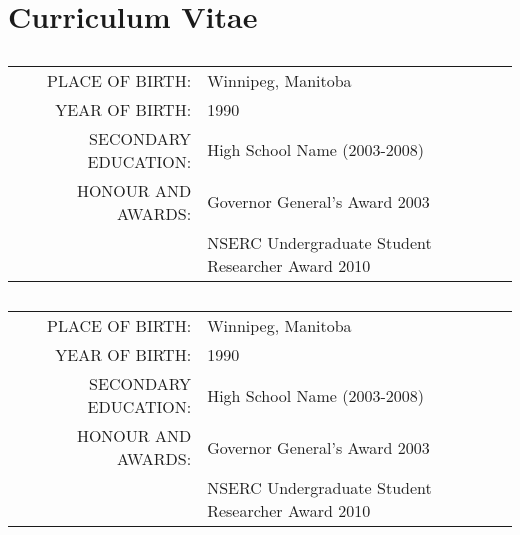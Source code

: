 
\chapter[Curriculum Vitae]{Curriculum Vitae}
\label{appendix:vitae}

\section*{\centering \StudentNameA}
\begin{table}[htdp]
\begin{center}
\begin{tabular}{rl}
	PLACE OF BIRTH: 
		& Winnipeg, Manitoba\\
	YEAR OF BIRTH: 
		& 1990 \\
	SECONDARY EDUCATION: 
		& High School Name (2003-2008) \\
	HONOUR AND AWARDS: 
		& Governor General's Award 2003 \\
		& NSERC Undergraduate Student Researcher Award 2010 \\
		
\end{tabular}
\end{center}
\end{table}

\section*{\centering \StudentNameB}
\begin{table}[htdp]
\begin{center}
\begin{tabular}{rl}
	PLACE OF BIRTH: 
		& Winnipeg, Manitoba\\
	YEAR OF BIRTH: 
		& 1990 \\
	SECONDARY EDUCATION: 
		& High School Name (2003-2008) \\
	HONOUR AND AWARDS: 
		& Governor General's Award 2003 \\
		& NSERC Undergraduate Student Researcher Award 2010 \\
\end{tabular}
\end{center}
\end{table}
\newpage

